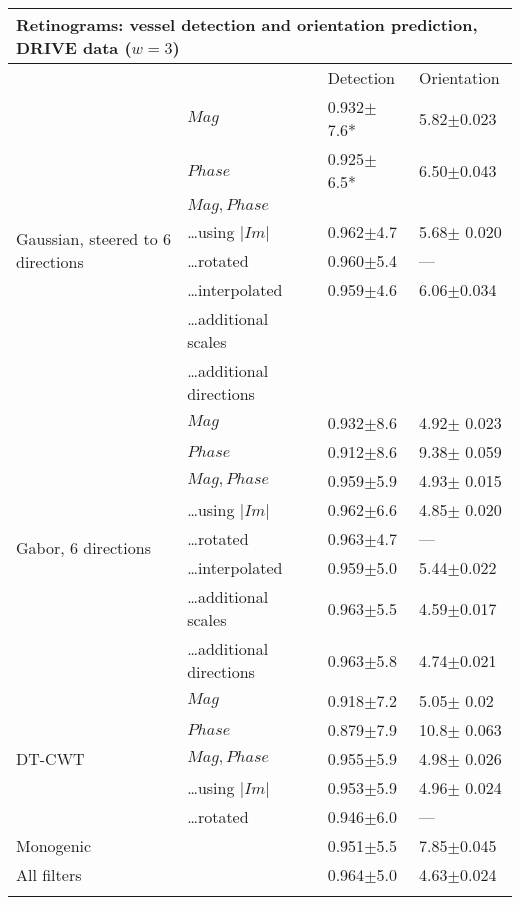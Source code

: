 \begin{tabularx}{\columnwidth}{X X X X}
\toprule
\multicolumn{4}{p{\columnwidth}}{ Retinograms: vessel detection and orientation prediction, 
\newline DRIVE data ($w = 3$)} \\
\midrule
        &                               & Detection         & Orientation \\
\midrule
\multirow{8}{2cm}{Gaussian, steered to 6 directions}
        & $Mag$                         & 0.932$\pm$7.6*    & 5.82$\pm$0.023 \\
        & $Phase$                       & 0.925$\pm$6.5*    & 6.50$\pm$0.043 \\
        & $Mag, Phase$                  &                   &  \\
        & \ldots using $|Im|$           & 0.962$\pm$4.7     & 5.68$\pm$ 0.020 \\
        & \ldots rotated                & 0.960$\pm$5.4     & --- \\
        & \ldots interpolated           & 0.959$\pm$4.6     & 6.06$\pm$0.034 \\
        & \ldots additional scales      &                   &  \\
        & \ldots additional directions  &                   &  \\
\midrule
\multirow{8}{2cm}{Gabor, 6 directions}
        & $Mag$                         & 0.932$\pm$8.6     & 4.92$\pm$ 0.023 \\
        & $Phase$                       & 0.912$\pm$8.6     & 9.38$\pm$ 0.059 \\
        & $Mag,Phase$                   & 0.959$\pm$5.9     & 4.93$\pm$ 0.015 \\
        & \ldots using $|Im|$           & 0.962$\pm$6.6     & 4.85$\pm$ 0.020 \\
        & \ldots rotated                & 0.963$\pm$4.7     & --- \\
        & \ldots interpolated           & 0.959$\pm$5.0     & 5.44$\pm$0.022 \\
        & \ldots additional scales      & 0.963$\pm$5.5     & 4.59$\pm$0.017 \\
        & \ldots additional directions  &0.963$\pm$5.8      & 4.74$\pm$0.021 \\
\midrule
\multirow{5}{2cm}{DT-CWT}
        & $Mag$                         & 0.918$\pm$7.2     & 5.05$\pm$ 0.02 \\
        & $Phase$                       & 0.879$\pm$7.9     & 10.8$\pm$ 0.063 \\
        & $Mag,Phase$                   & 0.955$\pm$5.9     & 4.98$\pm$ 0.026 \\
        & \ldots using $|Im|$           & 0.953$\pm$5.9     & 4.96$\pm$ 0.024 \\
        & \ldots rotated                & 0.946$\pm$6.0     & --- \\
\midrule
\multicolumn{2}{l}{Monogenic}           & 0.951$\pm$5.5     & 7.85$\pm$0.045 \\
\midrule
\multicolumn{2}{l}{All filters}         & 0.964$\pm$5.0     & 4.63$\pm$0.024 \\

\bottomrule
\noalign{\smallskip}
\end{tabularx} 
